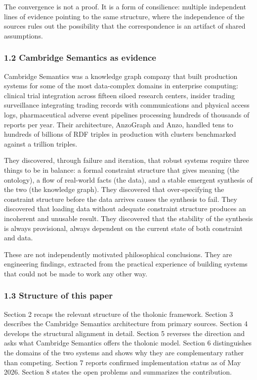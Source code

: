 \documentclass[
  11pt,
  letterpaper,
]{article}
\begin{document}
The convergence is not a proof. It is a form of consilience: multiple
independent lines of evidence pointing to the same structure, where the
independence of the sources rules out the possibility that the
correspondence is an artifact of shared assumptions.

\subsubsection{1.2 Cambridge Semantics as
evidence}\label{cambridge-semantics-as-evidence}

Cambridge Semantics was a knowledge graph company that built production
systems for some of the most data-complex domains in enterprise
computing: clinical trial integration across fifteen siloed research
centers, insider trading surveillance integrating trading records with
communications and physical access logs, pharmaceutical adverse event
pipelines processing hundreds of thousands of reports per year. Their
architecture, AnzoGraph and Anzo, handled tens to hundreds of billions
of RDF triples in production with clusters benchmarked against a
trillion triples.

They discovered, through failure and iteration, that robust systems
require three things to be in balance: a formal constraint structure
that gives meaning (the ontology), a flow of real-world facts (the
data), and a stable emergent synthesis of the two (the knowledge graph).
They discovered that over-specifying the constraint structure before the
data arrives causes the synthesis to fail. They discovered that loading
data without adequate constraint structure produces an incoherent and
unusable result. They discovered that the stability of the synthesis is
always provisional, always dependent on the current state of both
constraint and data.

These are not independently motivated philosophical conclusions. They
are engineering findings, extracted from the practical experience of
building systems that could not be made to work any other way.

\subsubsection{1.3 Structure of this
paper}\label{structure-of-this-paper}

Section 2 recaps the relevant structure of the tholonic framework.
Section 3 describes the Cambridge Semantics architecture from primary
sources. Section 4 develops the structural alignment in detail. Section
5 reverses the direction and asks what Cambridge Semantics offers the
tholonic model. Section 6 distinguishes the domains of the two systems
and shows why they are complementary rather than competing. Section 7
reports confirmed implementation status as of May 2026. Section 8 states
the open problems and summarizes the contribution.
\end{document}
